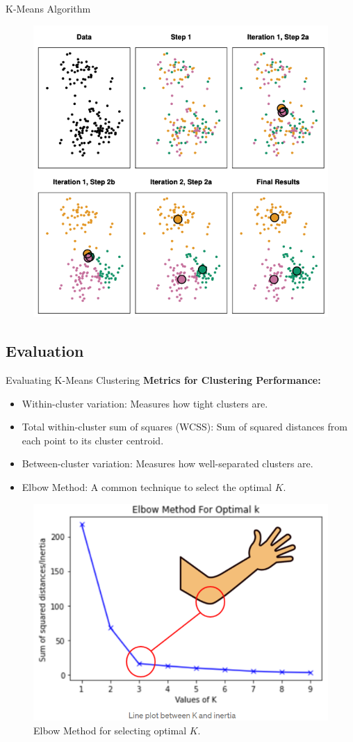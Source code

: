 \documentclass[aspectratio=169,xcolor=dvipsnames]{beamer}
\begin{document}
\begin{frame}{K-Means Algorithm}
\begin{figure}
\centering
\includegraphics[width=0.48\linewidth]{images/kmeans_graphic.png}
\end{figure}
\end{frame}

\subsection{Evaluation}
\begin{frame}{Evaluating K-Means Clustering}
    \textbf{Metrics for Clustering Performance:}
    \begin{itemize}
        \item Within-cluster variation: Measures how tight clusters are.
        \item Total within-cluster sum of squares (WCSS): Sum of squared distances from each point to its cluster centroid.
        \item Between-cluster variation: Measures how well-separated clusters are.
        \item Elbow Method: A common technique to select the optimal \( K \).
    \end{itemize}
    \begin{figure}
        \centering
        \includegraphics[width=0.4\linewidth]{images/elbow.png}
        \caption{Elbow Method for selecting optimal \( K \).}
    \end{figure}
\end{frame}
\end{document}
